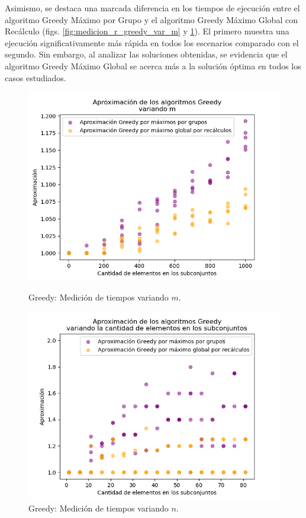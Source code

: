 Asimismo, se destaca una marcada diferencia en los tiempos de ejecución entre el algoritmo Greedy Máximo por Grupo y el algoritmo Greedy Máximo Global con Recálculo (figs. \ref{fig:medicion_r_greedy_var_m} y \ref{fig:medicion_r_greedy_var_b}). El primero muestra una ejecución significativamente más rápida en todos los escenarios comparado con el segundo. Sin embargo, al analizar las soluciones obtenidas, se evidencia que el algoritmo Greedy Máximo Global se acerca más a la solución óptima en todos los casos estudiados.

\begin{figure}[h]
    \centering
    \begin{minipage}{0.45\textwidth}
        \centering
        \includegraphics[width=\textwidth]{img/medicion_r_greedy_var_m.png}
        \caption{Greedy: Medición de tiempos variando $m$.}
        \label{fig:medicion_r_greedy_var_m}
    \end{minipage}\hfill
    \begin{minipage}{0.45\textwidth}
        \centering
        \includegraphics[width=\textwidth]{img/medicion_r_greedy_var_b.png}
        \caption{Greedy: Medición de tiempos variando $n$.}
        \label{fig:medicion_r_greedy_var_b}
    \end{minipage}
\end{figure}

